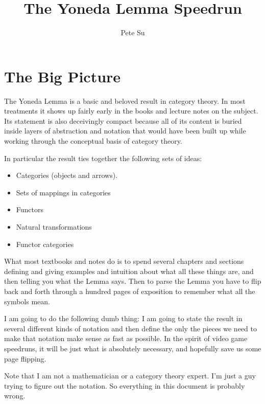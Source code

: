 \documentclass[12pt]{article}
\theoremstyle{definition}
\theoremstyle{definition}
\theoremstyle{definition}
\numberwithin{equation}{section}
\begin{document}
\title{\Large The Yoneda Lemma Speedrun}
\author{\large Pete Su}
\date{}

\maketitle

\section{The Big Picture}

The Yoneda Lemma is a basic and beloved result in category theory. In most treatments it
shows up fairly early in the books and lecture notes on the subject. Its
statement is also deceivingly compact because all of its content is buried inside layers
of abstraction and notation that would have been built up while working through the
conceptual basis of category theory.

In particular the result ties together the following sets of ideas:

\begin{itemize}

\item Categories (objects and arrows).
\item Sets of mappings in categories
\item Functors
\item Natural transformations
\item Functor categories

\end{itemize}

\noindent
What most textbooks and notes do is to spend several chapters and sections defining and
giving examples and intuition about what all these things are, and then telling you what
the Lemma says. Then to parse the Lemma you have to flip back and forth through a hundred 
pages of exposition to remember what all the symbols mean.

I am going to do the following dumb thing: I am going to state the result in several
different kinds of notation and then define the only the pieces we need to make that notation make sense as fast as possible.
In the spirit of video game speedruns, it will be just what is absolutely necessary, and hopefully save us some page flipping.

Note that I am not a mathematician or a category theory expert. I'm just a guy trying to
figure out the notation. So everything in this document is probably wrong.
\end{document}
